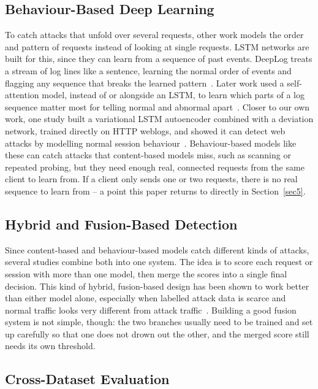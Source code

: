 \documentclass[futureinternet,article,accept,moreauthors]{Definitions/mdpi}
\begin{document}
\subsection{Behaviour-Based Deep Learning}

To catch attacks that unfold over several requests, other work models the order and pattern of requests instead of looking at single requests. LSTM networks are built for this, since they can learn from a sequence of past events. DeepLog treats a stream of log lines like a sentence, learning the normal order of events and flagging any sequence that breaks the learned pattern~\cite{du2017}. Later work used a self-attention model, instead of or alongside an LSTM, to learn which parts of a log sequence matter most for telling normal and abnormal apart~\cite{nedelkoski2020}. Closer to our own work, one study built a variational LSTM autoencoder combined with a deviation network, trained directly on HTTP weblogs, and showed it can detect web attacks by modelling normal session behaviour~\cite{jagat2024}. Behaviour-based models like these can catch attacks that content-based models miss, such as scanning or repeated probing, but they need enough real, connected requests from the same client to learn from. If a client only sends one or two requests, there is no real sequence to learn from -- a point this paper returns to directly in Section~\ref{sec5}.

\subsection{Hybrid and Fusion-Based Detection}

Since content-based and behaviour-based models catch different kinds of attacks, several studies combine both into one system. The idea is to score each request or session with more than one model, then merge the scores into a single final decision. This kind of hybrid, fusion-based design has been shown to work better than either model alone, especially when labelled attack data is scarce and normal traffic looks very different from attack traffic~\cite{kamal2025}. Building a good fusion system is not simple, though: the two branches usually need to be trained and set up carefully so that one does not drown out the other, and the merged score still needs its own threshold.

\subsection{Cross-Dataset Evaluation}
\end{document}
